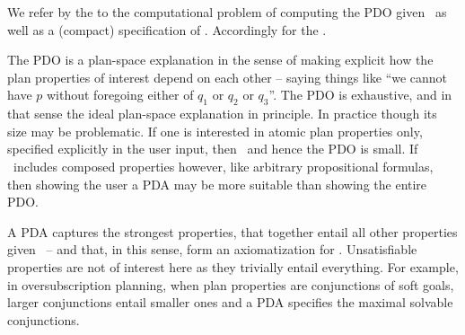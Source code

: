 We refer by the  to the computational problem of
computing the PDO given \task\ as well as a (compact) specification of
\props. Accordingly for the .

The PDO is a plan-space explanation in the sense of making explicit
how the plan properties of interest depend on each other -- saying
things like ``we cannot have $p$ without foregoing either of $q_1$ or
$q_2$ or $q_3$''. The PDO is exhaustive, and in that sense the ideal
plan-space explanation in principle. In practice though its size may
be problematic. If one is interested in atomic plan properties only,
specified explicitly in the user input, then \props\ and hence the PDO
is small. If \props\ includes composed properties however, like
arbitrary propositional formulas, then showing the user a PDA may be
more suitable than showing the entire PDO.

A PDA captures the strongest properties, that together entail all
other properties given \plans\ -- and that, in this sense, form an
axiomatization for \plans. Unsatisfiable properties are not of
interest here as they trivially entail everything. For example, in
oversubscription planning, when plan properties are conjunctions of
soft goals, larger conjunctions entail smaller ones and a PDA
specifies the maximal solvable conjunctions.

%


